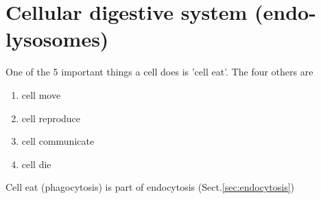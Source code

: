 \section{Cellular digestive system (endo-lysosomes)}

One of the 5 important things a cell does is 'cell eat'. The four others are
\begin{enumerate}
  \item cell move
  \item cell reproduce
  \item cell communicate
  \item cell die
\end{enumerate}

Cell eat (phagocytosis) is part of endocytosis (Sect.\ref{sec:endocytosis})

